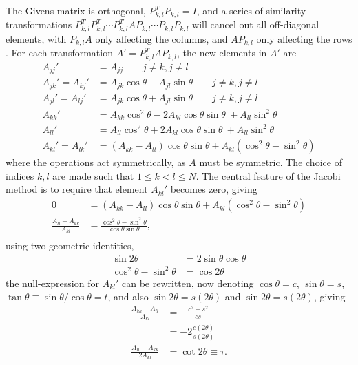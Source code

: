 \documentclass[a4paper,11pt]{article}
\begin{document}
The Givens matrix is orthogonal, $P_{k,l}^T P_{k,l} = I$, and a series of similarity transformations $P_{k,l}^T P_{k,l}^T \cdots P_{k,l}^T A P_{k,l} \cdots P_{k,l}  P_{k,l}$ will cancel out all off-diagonal elements, with $P_{k,l} A$ only affecting the columns, and $A P_{k,l}$ only affecting the rows \cite{numrecipes}. For each transformation $A' = P_{k,l}^T A P_{k,l} $, the new elements in $A'$ are
\begin{align*}
    A_{jj}'             &= A_{jj}   \qquad j\neq k, j \neq l \\
    A_{jk}' = A_{kj}'   &= A_{jk} \cos \theta - A_{jl} \sin\theta   \qquad j\neq k, j \neq l \\
    A_{jl}' = A_{lj}'   &= A_{jk} \cos \theta + A_{jl} \sin\theta   \qquad j\neq k, j \neq l \\
    A_{kk}' &= A_{kk} \cos^2\theta - 2 A_{kl} \cos\theta \sin\theta 
                    ~+ A_{ll} \sin^2\theta \\
    A_{ll}' &= A_{ll} \cos^2\theta + 2 A_{kl} \cos\theta \sin\theta 
                    ~+ A_{ll} \sin^2\theta \\
    A_{kl}' = A_{lk}'   &= \left( A_{kk} - A_{ll} \right) \cos\theta \sin\theta 
                + A_{kl} \left( \cos^2\theta -\sin^2\theta \right)
\end{align*}
where the operations act symmetrically, as $A$ must be symmetric. The choice of indices $k,l$ are made such that $1 \leq k < l \leq N$. The central feature of the Jacobi method is to require that element $A_{kl}'$ becomes zero, giving
\begin{align*}
    0   &= \left( A_{kk} - A_{ll} \right) \cos\theta \sin\theta 
                + A_{kl} \left( \cos^2\theta -\sin^2\theta \right) \\
    \frac{A_{ll} - A_{kk}}{A_{kl}} &= \frac{\cos^2\theta - \sin^2\theta}{\cos\theta \sin\theta}, \\
\end{align*}
using two geometric identities,
\begin{align*}
    \sin 2\theta &= 2\sin\theta \cos\theta \\
    \cos^2\theta - \sin^2 \theta &= \cos 2\theta 
\end{align*}
the null-expression for $A_{kl}'$ can be rewritten, now denoting $\cos\theta = c$, $\sin\theta  = s$, $\tan \theta \equiv \sin\theta/\cos\theta = t$, and also $\sin 2\theta = s(2\theta)$ and $\sin 2\theta = s\left( 2\theta \right)$, giving
\begin{align*}
    \frac{A_{kk} - A_{ll}}{A_{kl}} &= - \frac{c^2 - s^2}{cs} \\
    &= -2 \frac{c\left( 2\theta \right)}{s\left( 2\theta \right)} \\
    \frac{A_{ll} - A_{kk}}{2A_{kl}} &= \cot 2\theta \equiv \tau.
\end{align*}
\end{document}
